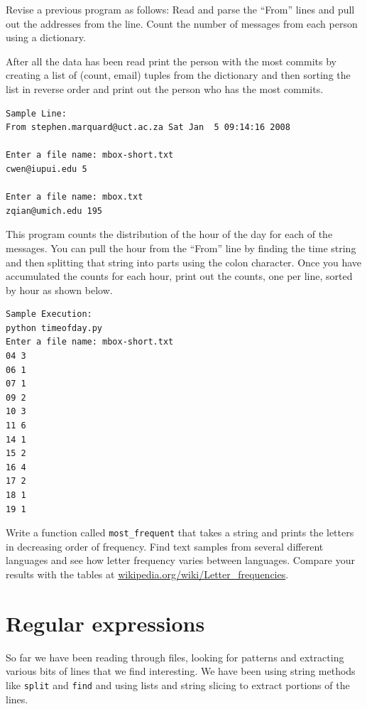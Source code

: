 \documentclass[10pt]{book}
\begin{document}
\begin{ex}
Revise a previous program as follows:  Read and 
parse the ``From'' lines and pull out the 
addresses from the line.   Count the number of
messages from each person using a dictionary.

After all the data has been read print 
the person with the most commits by creating
a list of (count, email) tuples from the 
dictionary and then sorting the list in reverse
order and print out the person who has the most
commits.

\beforeverb
\begin{verbatim}
Sample Line:
From stephen.marquard@uct.ac.za Sat Jan  5 09:14:16 2008

Enter a file name: mbox-short.txt
cwen@iupui.edu 5

Enter a file name: mbox.txt
zqian@umich.edu 195
\end{verbatim}
\afterverb
\end{ex}
\begin{ex}
This program counts the distribution of the hour of the day for 
each of the messages. You can pull the hour from the ``From'' 
line by finding the time string and then splitting that string 
into parts using the colon character. Once you have accumulated 
the counts for each hour, print out the counts, one per line, 
sorted by hour as shown below. 
\beforeverb
\begin{verbatim}
Sample Execution:
python timeofday.py
Enter a file name: mbox-short.txt
04 3
06 1
07 1
09 2
10 3
11 6
14 1
15 2
16 4
17 2
18 1
19 1
\end{verbatim}
\afterverb
\end{ex}


\begin{ex}
Write a function called \verb"most_frequent" that takes a string and
prints the letters in decreasing order of frequency.  Find text
samples from several different languages and see how letter frequency
varies between languages.  Compare your results with the tables at
\url{wikipedia.org/wiki/Letter_frequencies}.


\end{ex}

\chapter{Regular expressions}

So far we have been reading through files, looking for patterns and extracting various bits of lines that we find interesting.  We have been using string methods like {\tt split} and {\tt find} and using lists and string slicing to extract portions of the lines.
\end{document}
